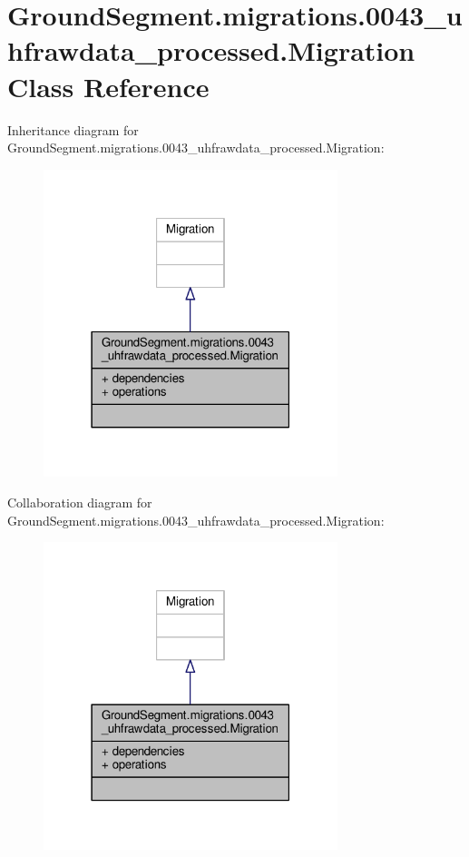 \hypertarget{class_ground_segment_1_1migrations_1_10043__uhfrawdata__processed_1_1_migration}{}\section{Ground\+Segment.\+migrations.0043\+\_\+uhfrawdata\+\_\+processed.Migration Class Reference}
\label{class_ground_segment_1_1migrations_1_10043__uhfrawdata__processed_1_1_migration}


Inheritance diagram for Ground\+Segment.\+migrations.0043\+\_\+uhfrawdata\+\_\+processed.Migration\+:\nopagebreak
\begin{figure}[H]
\begin{center}
\leavevmode
\includegraphics[width=243pt]{class_ground_segment_1_1migrations_1_10043__uhfrawdata__processed_1_1_migration__inherit__graph}
\end{center}
\end{figure}


Collaboration diagram for Ground\+Segment.\+migrations.0043\+\_\+uhfrawdata\+\_\+processed.Migration\+:\nopagebreak
\begin{figure}[H]
\begin{center}
\leavevmode
\includegraphics[width=243pt]{class_ground_segment_1_1migrations_1_10043__uhfrawdata__processed_1_1_migration__coll__graph}
\end{center}
\end{figure}
